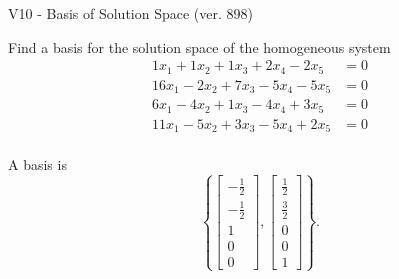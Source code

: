 \begin{exercise}
  \begin{exerciseTitle}V10 - Basis of Solution Space (ver. 898)\end{exerciseTitle}
  \begin{exerciseStatement}
    Find a basis for the solution space of the homogeneous system 
\begin{align*}
 1 x_ 1 + 1 x_ 2 + 1 x_ 3 + 2 x_ 4 -2 x_ 5 &= 0  \\ 
  16 x_ 1 -2 x_ 2 + 7 x_ 3 -5 x_ 4 -5 x_ 5 &= 0  \\ 
  6 x_ 1 -4 x_ 2 + 1 x_ 3 -4 x_ 4 + 3 x_ 5 &= 0  \\ 
  11 x_ 1 -5 x_ 2 + 3 x_ 3 -5 x_ 4 + 2 x_ 5 &= 0  \\ 
 \end{align*}


 
  \end{exerciseStatement}

  \begin{exerciseAnswer}
   A basis is   
\[\left\{\left[\begin{array}{c}
-\frac{1}{2} \\
-\frac{1}{2} \\
1 \\
0 \\
0
\end{array}\right] , \left[\begin{array}{c}
\frac{1}{2} \\
\frac{3}{2} \\
0 \\
0 \\
1
\end{array}\right]\right\}.\]

  


  \end{exerciseAnswer}
\end{exercise}